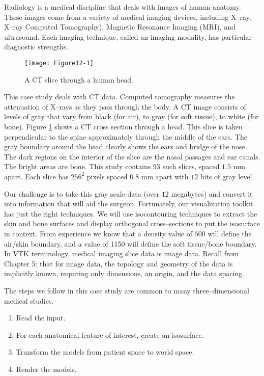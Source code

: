 Radiology is a medical discipline that deals with images of human anatomy.
These images come from a variety of medical imaging devices, including X--ray, X--ray Computed Tomography), Magnetic Resonance Imaging (MRI), and ultrasound. Each imaging technique, called an imaging modality, has particular diagnostic strengths.

\begin{figure}[!htb]
	\centering
	\texttt{[image: Figure12-1]}
	\caption{A CT slice through a human head.}
	\label{fig:Figure12-1}
\end{figure}

This case study deals with CT data. Computed tomography measures the attenuation of X--rays as they pass through the body. A CT image consists of levels of gray that vary from black (for air), to gray (for soft tissue), to white (for bone).  Figure \ref{fig:Figure12-1} shows a CT cross section through a head. This slice is taken perpendicular to the spine approximately through the middle of the ears.  The gray boundary around the head clearly shows the ears and bridge of the nose. The dark regions on the interior of the slice are the nasal passages and ear canals. The bright areas are bone. This study contains 93 such slices, spaced $1.5$ mm apart. Each slice has $256^2$ pixels spaced 0.8 mm apart with $12$ bits of gray level.

Our challenge is to take this gray scale data (over $12$ megabytes) and convert it into information that will aid the surgeon. Fortunately, our visualization toolkit has just the right techniques. We will use isocontouring techniques to extract the skin and bone surfaces and display orthogonal cross--sections to put the isosurface in context. From experience we know that a density value of $500$ will define the air/skin boundary, and a value of 1150 will define the soft tissue/bone boundary. In VTK terminology, medical imaging slice data is image data. Recall from Chapter 5:  that for image data, the topology and geometry of the data is implicitly known, requiring only dimensions, an origin, and the data spacing.

The steps we follow in this case study are common to many three--dimensional medical studies.
\begin{enumerate}

    \item Read the input.

    \item For each anatomical feature of interest, create an isosurface.

    \item Transform the models from patient space to world space.

    \item Render the models.

\end{enumerate}

